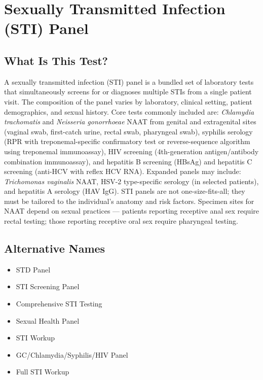 \chapter{Sexually Transmitted Infection (STI) Panel}

\section*{What Is This Test?}
A sexually transmitted infection (STI) panel is a bundled set of laboratory tests that simultaneously screens for or diagnoses multiple STIs from a single patient visit. The composition of the panel varies by laboratory, clinical setting, patient demographics, and sexual history. Core tests commonly included are: \textit{Chlamydia trachomatis} and \textit{Neisseria gonorrhoeae} NAAT from genital and extragenital sites (vaginal swab, first-catch urine, rectal swab, pharyngeal swab), syphilis serology (RPR with treponemal-specific confirmatory test or reverse-sequence algorithm using treponemal immunoassay), HIV screening (4th-generation antigen/antibody combination immunoassay), and hepatitis B screening (HBsAg) and hepatitis C screening (anti-HCV with reflex HCV RNA). Expanded panels may include: \textit{Trichomonas vaginalis} NAAT, HSV-2 type-specific serology (in selected patients), and hepatitis A serology (HAV IgG). STI panels are not one-size-fits-all; they must be tailored to the individual's anatomy and risk factors. Specimen sites for NAAT depend on sexual practices --- patients reporting receptive anal sex require rectal testing; those reporting receptive oral sex require pharyngeal testing.

\section*{Alternative Names}
\begin{itemize}
  \item STD Panel
  \item STI Screening Panel
  \item Comprehensive STI Testing
  \item Sexual Health Panel
  \item STI Workup
  \item GC/Chlamydia/Syphilis/HIV Panel
  \item Full STI Workup
\end{itemize}
